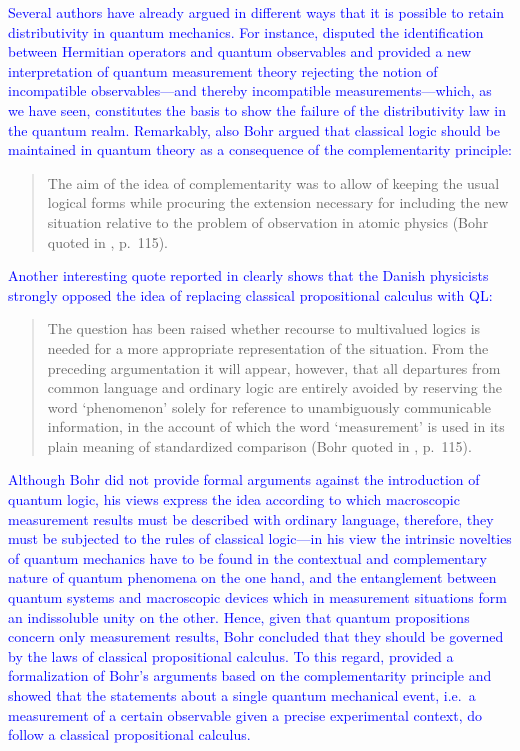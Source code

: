 \documentclass[11pt, executivepaper]{article}
\begin{document}
\begin{enumerate}
\textcolor{blue}{Several authors have already argued in different ways that it is possible to retain distributivity in quantum mechanics. For instance, \cite{Park:1968} disputed the identification between Hermitian operators and quantum observables and provided a new interpretation of quantum measurement theory rejecting the notion of incompatible observables---and thereby incompatible measurements---which, as we have seen, constitutes the basis to show the failure of the distributivity law in the quantum realm. Remarkably, also Bohr argued that classical logic should be maintained in quantum theory as a consequence of the complementarity principle:
\begin{quote}
The aim of the idea of complementarity was to allow of keeping the usual logical forms while procuring the extension necessary for including the new situation relative to the problem of observation in atomic physics (Bohr quoted in \cite{Faye:2021}, p.\ 115).
\end{quote}
Another interesting quote reported in \cite{Faye:2021} clearly shows that the Danish physicists strongly opposed the idea of replacing classical propositional calculus with QL: 
\begin{quote}
The question has been raised whether recourse to multivalued logics is needed for a more appropriate representation of the situation. From the preceding argumentation it will appear, however, that all departures from common language and ordinary logic are entirely avoided by reserving the word `phenomenon' solely for reference to unambiguously communicable information, in the account of which the word `measurement' is used in its plain meaning of standardized comparison (Bohr quoted in \cite{Faye:2021}, p.\ 115).
\end{quote}
Although Bohr did not provide formal arguments against the introduction of quantum logic, his views express the idea according to which macroscopic measurement results must be described with ordinary language, therefore, they must be subjected to the rules of classical logic---in his view the intrinsic novelties of quantum mechanics have to be found in the contextual and complementary nature of quantum phenomena on the one hand, and the entanglement between quantum systems and macroscopic devices which in measurement situations form an indissoluble unity on the other. Hence, given that quantum propositions concern only measurement results, Bohr concluded that they should be governed by the laws of classical propositional calculus.
To this regard, \cite{Heelan:1970} provided a formalization of Bohr's arguments based on the complementarity principle and showed that the statements about a single quantum mechanical event, i.e.\ a measurement of a certain observable given a precise experimental context, do follow a classical propositional calculus.} 


\end{enumerate}
\end{document}
